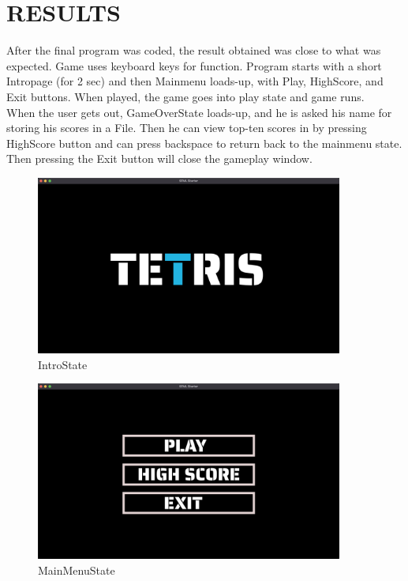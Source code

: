 \newpage
\section{RESULTS}

\hspace{5mm} After the final program was coded, the result obtained was close to what was expected. Game uses keyboard keys for function. Program starts with a short Intropage (for 2 sec) and then Mainmenu loads-up, with Play, HighScore, and Exit buttons. When played, the game goes into play state and game runs.\\ 

When the user gets out, GameOverState loads-up, and he is asked his name for storing his scores in a File. Then he can view top-ten scores in by pressing HighScore button and can press backspace to return back to the mainmenu state.\\
Then  pressing the Exit button will close the gameplay window.\\

\begin{figure}[H]
	\centering
	\includegraphics[width=0.9\textwidth]{images/IntroState}
	\caption{IntroState}
\end{figure}

\begin{figure}[H]
	\centering
	\includegraphics[width=0.9\textwidth]{images/MainMenuState.png}
	\caption{MainMenuState}
\end{figure}


